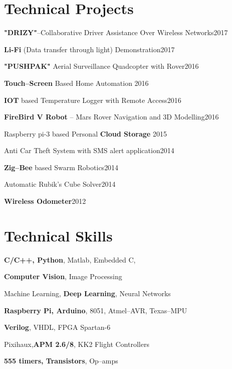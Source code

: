 \halfblankline

\section{Technical Projects}
\begin{innerlist}
    \item \textbf{"DRIZY"}--Collaborative Driver Assistance Over Wireless Networks\hfill {2017}
    \item \textbf{Li-Fi} (Data transfer through light) Demonstration\hfill {2017}
    \item \textbf{"PUSHPAK"} Aerial Surveillance Quadcopter with Rover\hfill {2016}
    \item \textbf{Touch--Screen} Based Home Automation \hfill {2016}
    \item \textbf{IOT} based Temperature Logger with Remote Access\hfill {2016}
    \item \textbf{FireBird V Robot} -- Mars Rover Navigation and 3D Modelling\hfill {2016}
    \item Raspberry pi-3 based Personal \textbf{Cloud Storage} \hfill {2015}
    \item Anti Car Theft System with SMS alert application\hfill {2014}
    \item \textbf{Zig--Bee} based Swarm Robotics\hfill {2014}
    \item Automatic Rubik’s Cube Solver\hfill {2014}
    \item \textbf{Wireless Odometer}\hfill {2012}
\end{innerlist}

\halfblankline

\section{Technical Skills}
\begin{innerlist}
    \item \textbf{C/C++, Python}, Matlab, Embedded C, 
    \item \textbf{Computer Vision}, Image Processing
    \item Machine Learning, \textbf{Deep Learning}, Neural Networks
    \item \textbf{Raspberry Pi, Arduino}, 8051, Atmel--AVR, Texas--MPU
    \item \textbf{Verilog}, VHDL, FPGA Spartan-6
    \item Pixihaux,\textbf{APM 2.6/8}, KK2 Flight Controllers
    \item \textbf{555 timers, Transistors}, Op--amps
\end{innerlist}

\halfblankline




